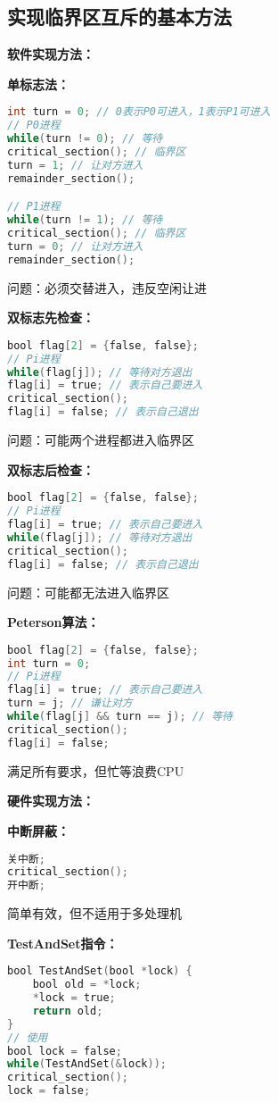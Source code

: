\documentclass[lang=cn,newtx,10pt,scheme=chinese]{../../elegantbook}
\begin{document}
\subsection{实现临界区互斥的基本方法}

\textbf{软件实现方法：}

\textbf{单标志法：}
\begin{lstlisting}[language=C]
int turn = 0; // 0表示P0可进入，1表示P1可进入
// P0进程
while(turn != 0); // 等待
critical_section(); // 临界区
turn = 1; // 让对方进入
remainder_section();

// P1进程  
while(turn != 1); // 等待
critical_section(); // 临界区
turn = 0; // 让对方进入
remainder_section();
\end{lstlisting}
问题：必须交替进入，违反空闲让进

\textbf{双标志先检查：}
\begin{lstlisting}[language=C]
bool flag[2] = {false, false};
// Pi进程
while(flag[j]); // 等待对方退出
flag[i] = true; // 表示自己要进入
critical_section();
flag[i] = false; // 表示自己退出
\end{lstlisting}
问题：可能两个进程都进入临界区

\textbf{双标志后检查：}
\begin{lstlisting}[language=C]
bool flag[2] = {false, false};
// Pi进程
flag[i] = true; // 表示自己要进入
while(flag[j]); // 等待对方退出
critical_section();
flag[i] = false; // 表示自己退出
\end{lstlisting}
问题：可能都无法进入临界区

\textbf{Peterson算法：}
\begin{lstlisting}[language=C]
bool flag[2] = {false, false};
int turn = 0;
// Pi进程
flag[i] = true; // 表示自己要进入
turn = j; // 谦让对方
while(flag[j] && turn == j); // 等待
critical_section();
flag[i] = false;
\end{lstlisting}
满足所有要求，但忙等浪费CPU

\textbf{硬件实现方法：}

\textbf{中断屏蔽：}
\begin{lstlisting}[language=C]
关中断;
critical_section();
开中断;
\end{lstlisting}
简单有效，但不适用于多处理机

\textbf{TestAndSet指令：}
\begin{lstlisting}[language=C]
bool TestAndSet(bool *lock) {
    bool old = *lock;
    *lock = true;
    return old;
}
// 使用
bool lock = false;
while(TestAndSet(&lock));
critical_section();
lock = false;
\end{lstlisting}
\end{document}
